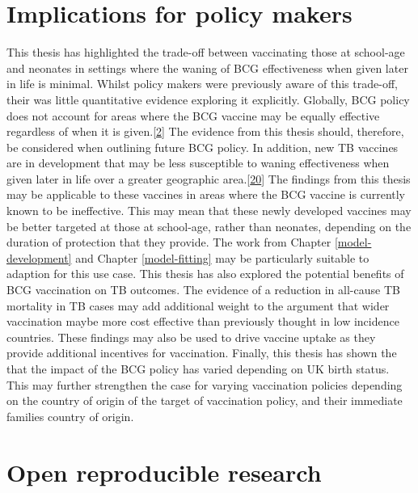 \documentclass[11pt,twoside]{bristolthesis}
\begin{document}
  \hypertarget{implications-for-policy-makers}{%
  \section{Implications for policy makers}\label{implications-for-policy-makers}}
  
  This thesis has highlighted the trade-off between vaccinating those at school-age and neonates in settings where the waning of BCG effectiveness when given later in life is minimal. Whilst policy makers were previously aware of this trade-off, their was little quantitative evidence exploring it explicitly. Globally, BCG policy does not account for areas where the BCG vaccine may be equally effective regardless of when it is given.{[}\protect\hyperlink{ref-TheWorldHealthOrganization:2018va}{2}{]} The evidence from this thesis should, therefore, be considered when outlining future BCG policy. In addition, new TB vaccines are in development that may be less susceptible to waning effectiveness when given later in life over a greater geographic area.{[}\protect\hyperlink{ref-Medicine2013}{20}{]} The findings from this thesis may be applicable to these vaccines in areas where the BCG vaccine is currently known to be ineffective. This may mean that these newly developed vaccines may be better targeted at those at school-age, rather than neonates, depending on the duration of protection that they provide. The work from Chapter \ref{model-development} and Chapter \ref{model-fitting} may be particularly suitable to adaption for this use case. This thesis has also explored the potential benefits of BCG vaccination on TB outcomes. The evidence of a reduction in all-cause TB mortality in TB cases may add additional weight to the argument that wider vaccination maybe more cost effective than previously thought in low incidence countries. These findings may also be used to drive vaccine uptake as they provide additional incentives for vaccination. Finally, this thesis has shown the that the impact of the BCG policy has varied depending on UK birth status. This may further strengthen the case for varying vaccination policies depending on the country of origin of the target of vaccination policy, and their immediate families country of origin.
  
  \hypertarget{open-reproducible-research}{%
  \section{Open reproducible research}\label{open-reproducible-research}}
  
\end{document}
